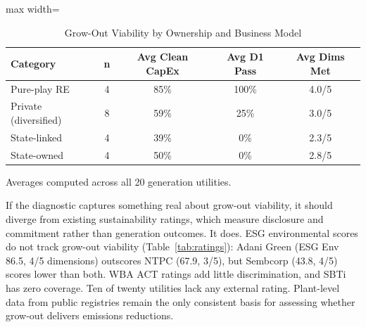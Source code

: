 \documentclass[review,3p,authoryear]{elsarticle}
\begin{document}
\begin{table}[H]
\centering
\caption{Grow-Out Viability by Ownership and Business Model}
\label{tab:ownership}
\begin{adjustbox}{max width=\linewidth}
\begin{tabular}{@{}lcccc@{}}
\toprule
\textbf{Category} & \textbf{n} & \textbf{Avg Clean CapEx} & \textbf{Avg D1 Pass} & \textbf{Avg Dims Met} \\
\midrule
Pure-play RE & 4 & 85\% & 100\% & 4.0/5 \\
Private (diversified) & 8 & 59\% & 25\% & 3.0/5 \\
State-linked & 4 & 39\% & 0\% & 2.3/5 \\
State-owned & 4 & 50\% & 0\% & 2.8/5 \\
\bottomrule
\end{tabular}
\end{adjustbox}
\begin{flushleft}
\footnotesize{Averages computed across all 20 generation utilities.}
\end{flushleft}
\end{table}



If the diagnostic captures something real about grow-out viability, it should diverge from existing sustainability ratings, which measure disclosure and commitment rather than generation outcomes. It does. ESG environmental scores do not track grow-out viability (Table~\ref{tab:ratings}): Adani Green (ESG Env 86.5, 4/5 dimensions) outscores NTPC (67.9, 3/5), but Sembcorp (43.8, 4/5) scores lower than both. WBA ACT ratings add little discrimination, and SBTi has zero coverage. Ten of twenty utilities lack any external rating. Plant-level data from public registries remain the only consistent basis for assessing whether grow-out delivers emissions reductions.
\end{document}
